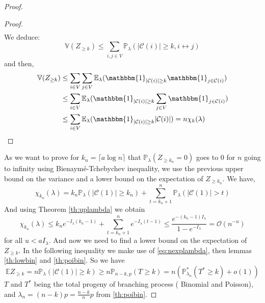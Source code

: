 \begin{proof}
\begin{proof}
\begin{align}
		\end{align}
		We deduce:
		\begin{equation}
			\mathbb{V}(Z_{\geq k}) \leq \sum_{i,j \in V} \mathbb{P}_{\lambda}(|\mathcal{C}(i)|\geq k, i \leftrightarrow j)
		\end{equation}
		and then,
		\begin{align}
			\mathbb{V}(Z_{\geq k}) &\leq \sum_{i \in V}\sum_{j \in V} \mathbb{E}_{\lambda} ( \mathbbm{1}_{|\mathcal{C}(i)|\geq k} \mathbbm{1}_{j \in \mathcal{C}(i)})\\
				&\leq \sum_{i \in V} \mathbb{E}_{\lambda} ( \mathbbm{1}_{|\mathcal{C}(i)|\geq k} \sum_{j\in V} \mathbbm{1}_{j \in \mathcal{C}(i)}) \\
				&\leq \sum_{i \in V} \mathbb{E}_{\lambda} ( \mathbbm{1}_{|\mathcal{C}(i)|\geq k}  |\mathcal{C}(i)|) = n\chi_k(\lambda) 
		\end{align}
	\end{proof}
	As we want to prove for $k_n = \lceil a\log n\rceil$ that $\mathbb{P}_{\lambda}(Z_{\geq k_n} = 0)$ goes to 0 for $n$ going to infinity using Bienaymé-Tchebychev inequality, we use the previous upper bound on the variance and a lower bound on the expectation of $Z_{\geq k_n}$.
	\newline
	We have,
	\begin{equation}
		\chi_{k_n}(\lambda) = k_n \mathbb{P}_{\lambda}(|\mathcal{C}(1)| \geq k_n) + \sum_{t=k_n+1}^{n} \mathbb{P}_{\lambda}(|\mathcal{C}(1)| > t) 
	\end{equation}
	And using Theorem \ref{th:uplambda} we obtain
	\begin{equation}
		\chi_{k_n}(\lambda) \leq k_ne^{-I_{\lambda}(k_n - 1)} +\sum_{t=k_n +1 }^{n} e^{-I_{\lambda}(t-1)} \leq \frac{e^{-(k_n -1)I_{\lambda}}}{1-e^{-I_{\lambda}}} = \mathcal{O}(n^{-u})
	\end{equation}
	for all $u < aI_{\lambda}$.
	And now we need to find a lower bound on the expectation of $Z_{\geq k}$.
	In the following inequality we make use of \eqref{eq:nexplambda}, then lemmas \ref{th:lowbin} and \ref{th:poibin}.
	So we have
	\begin{equation}
		\mathbb{E} Z_{\geq k} = n \mathbb{P}_{\lambda}(|\mathcal{C}(1)| \geq k) \geq n \mathbb{P}_{n-k, p}(T \geq k) 
		= n(\mathbb{P}_{\lambda_n}^*(T^* \geq k) + o(1) )
	\end{equation}
	$T$ and $T^*$ being the total progeny of branching process ( Binomial and Poisson), and $\lambda_n = (n-k)p = \frac{n-k}{n}p$ from \eqref{th:poibin}.
	\newline

\end{proof}

